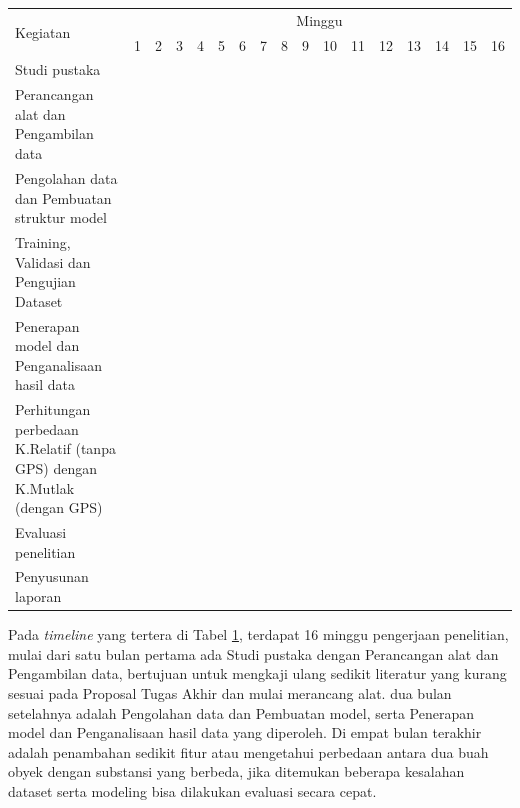 \newcommand{\w}{}
\newcommand{\G}{\cellcolor{gray}}
\begin{table}[h!]
  \begin{tabular}{|p{3.5cm}|c|c|c|c|c|c|c|c|c|c|c|c|c|c|c|c|}

    \hline
    \multirow{2}{*}{Kegiatan} & \multicolumn{16}{|c|}{Minggu} \\
    \cline{2-17} &
    1 & 2 & 3 & 4 & 5 & 6 & 7 & 8 & 9 & 10 & 11 & 12 & 13 & 14 & 15 & 16 \\
    \hline

    Studi pustaka &
    \G & \G & \G & \w & \w & \w & \w & \w & \w & \w & \w & \w & \w & \w & \w & \w \\
    \hline

    Perancangan alat dan Pengambilan data &
    \w & \G & \G & \G & \w & \w & \w & \w & \w & \w & \w & \w & \w & \w & \w & \w \\
    \hline

    Pengolahan data dan Pembuatan struktur model &
    \w & \w & \w & \w & \G & \G & \G & \G & \w & \w & \w & \w & \w & \w & \w & \w \\
    \hline

    Training, Validasi dan Pengujian Dataset &
    \w & \w & \w & \w & \w & \w & \G & \G & \G & \G & \w & \w & \w & \w & \w & \w \\
    \hline

    Penerapan model dan Penganalisaan hasil data &
    \w & \w & \w & \w & \w & \w & \w & \w & \G & \G & \G & \G & \w & \w & \w & \w \\
    \hline

    Perhitungan perbedaan K.Relatif (tanpa GPS) dengan K.Mutlak (dengan GPS) &
    \w & \w & \w & \w & \w & \w & \w & \w & \w & \w & \w & \w & \G & \G & \G & \w \\
    \hline

    Evaluasi penelitian &
    \w & \w & \w & \w & \w & \w & \w & \w & \w & \w & \w & \w & \w & \w & \G & \G \\
    \hline

    Penyusunan laporan &
    \G & \G & \G & \G & \G & \G & \G & \G & \G & \G & \G & \G & \G & \G & \G & \G \\
    \hline

  \end{tabular}
  \label{tbl:timeline}
\end{table}

Pada \emph{timeline} yang tertera di Tabel \ref{tbl:timeline}, terdapat 16 minggu pengerjaan penelitian, 
mulai dari satu bulan pertama ada Studi pustaka dengan Perancangan alat dan Pengambilan data, 
bertujuan untuk mengkaji ulang sedikit literatur yang kurang sesuai pada Proposal Tugas Akhir dan mulai 
merancang alat. dua bulan setelahnya adalah Pengolahan data dan Pembuatan model, serta Penerapan model dan 
Penganalisaan hasil data yang diperoleh. Di empat bulan terakhir adalah penambahan sedikit fitur atau mengetahui 
perbedaan antara dua buah obyek dengan substansi yang berbeda, jika ditemukan beberapa kesalahan dataset serta modeling 
bisa dilakukan evaluasi secara cepat.